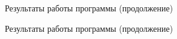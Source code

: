 \begin{figure}[h!]
\caption{Результаты работы программы (продолжение)}
\label{ris:image}
\end{figure}
\begin{figure}[h!]
\caption{Результаты работы программы (продолжение)}
\label{ris:image}
\end{figure}
\newline
\newpage
\newpage
